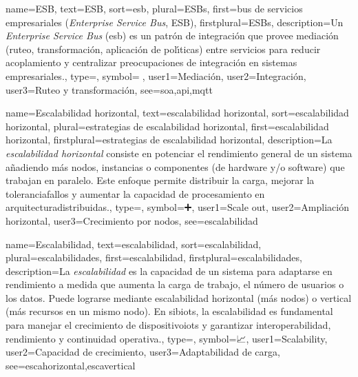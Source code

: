 	
	{
		name={{ESB}},
		text={{ESB}},
		sort={esb},
		plural={{ESBs}},
		first={bus de servicios empresariales (\textit{Enterprise Service Bus}, ESB)},
		firstplural={{ESBs}},
		description={Un \emph{Enterprise Service Bus} (\gls{esb}) es un patr{\'o}n de integraci{\'o}n que provee mediaci{\'o}n (ruteo, transformaci{\'o}n, aplicaci{\'o}n de pol{\'\i}ticas) entre \glspl{servicio} para reducir acoplamiento y centralizar preocupaciones de integraci{\'o}n en sistemas empresariales.},
		type=\glsdefaulttype,
		symbol={🚌},
		user1={Mediaci{\'o}n},
		user2={Integraci{\'o}n},
		user3={Ruteo y transformaci{\'o}n},
		see={soa,api,mqtt}
	}
	
	{
		name={Escalabilidad horizontal},
		text={escalabilidad horizontal},
		sort={escalabilidad horizontal},
		plural={estrategias de escalabilidad horizontal},
		first={escalabilidad horizontal},
		firstplural={estrategias de escalabilidad horizontal},
		description={La \emph{escalabilidad horizontal} consiste en potenciar el rendimiento general de un \gls{sistema} a{\~n}adiendo m{\'a}s \glspl{nodo}, instancias o \glspl{componente} (de \gls{hardware} y/o \gls{software}) que trabajan en paralelo. Este enfoque permite distribuir la carga, mejorar la \gls{toleranciafallos} y aumentar la capacidad de procesamiento en \glspl{arquitecturadistribuida}.},
		type=\glsdefaulttype,
		symbol={➕},
		user1={Scale out},
		user2={Ampliaci{\'o}n horizontal},
		user3={Crecimiento por nodos},
		see={escalabilidad}
	}
	
	{
		name={Escalabilidad},
		text={escalabilidad},
		sort={escalabilidad},
		plural={escalabilidades},
		first={escalabilidad},
		firstplural={escalabilidades},
		description={La \emph{escalabilidad} es la capacidad de un \gls{sistema} para adaptarse en rendimiento a medida que aumenta la carga de trabajo, el n{\'u}mero de usuarios o los \glspl{dato}. Puede lograrse mediante escalabilidad horizontal (m{\'a}s nodos) o vertical (m{\'a}s recursos en un mismo nodo). En \glspl{sibiot}, la escalabilidad es fundamental para manejar el crecimiento de \glspl{dispositivoiot} y garantizar \gls{interoperabilidad}, rendimiento y continuidad operativa.},
		type=\glsdefaulttype,
		symbol={📈},
		user1={Scalability},
		user2={Capacidad de crecimiento},
		user3={Adaptabilidad de carga},
		see={escahorizontal,escavertical}
	}
	
